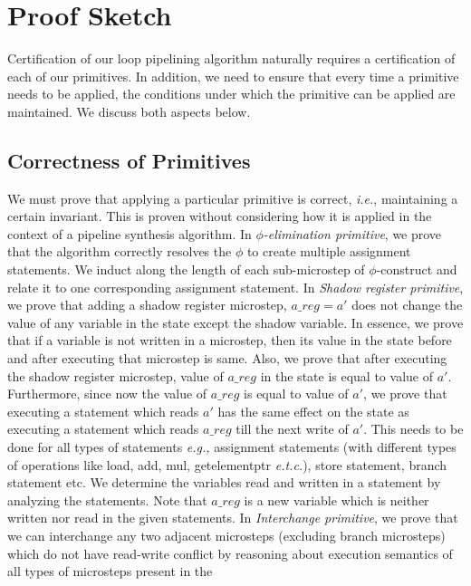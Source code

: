 \section{Proof Sketch}
\label{sec:proof}

Certification of our loop pipelining algorithm naturally requires a certification of each of our primitives. In addition, we need to ensure that every time a primitive needs to be applied, the conditions under which the primitive can be applied are maintained. We discuss both aspects below.

\subsection{Correctness of Primitives}
We must prove that applying a particular primitive is correct, 
{\em i.e.}, maintaining a certain invariant. This is proven without
considering how it is applied in the context of a pipeline
synthesis algorithm. In {\em $\phi$-elimination primitive}, we prove that the algorithm 
correctly resolves the $\phi$ to create multiple assignment statements. 
We induct along the length of each sub-microstep of $\phi$-construct and
relate it to one corresponding assignment statement. 
In {\em Shadow register primitive}, we prove that adding a shadow register microstep, $a\_reg = a'$ 
does not change the value of any variable in the state except the shadow variable. In essence, we prove
that if a variable is not written in a microstep, then its value in the state before and after executing
that microstep is same. Also, we prove that after executing the shadow register microstep,
value of $a\_reg$ in the state is equal to value of $a'$. Furthermore, since now
the value of $a\_reg$ is equal to value of $a'$, we prove that executing a statement which reads $a'$ has the same
effect on the state as executing a statement which reads $a\_reg$ till the next write of $a'$. This needs to be done for all types of
  statements {\em e.g.,} assignment statements (with different types of 
  operations like load, add, mul, getelementptr {\em e.t.c.}), 
  store statement, branch statement etc. We determine the variables read and 
  written in a statement by analyzing the statements. 
  Note that $a\_reg$ is a new variable which
  is neither written nor read in the given statements. In {\em Interchange primitive}, we prove 
  that we can interchange any two adjacent microsteps
 (excluding branch microsteps) which do not have read-write conflict by reasoning about execution
  semantics of all types of microsteps present in the
